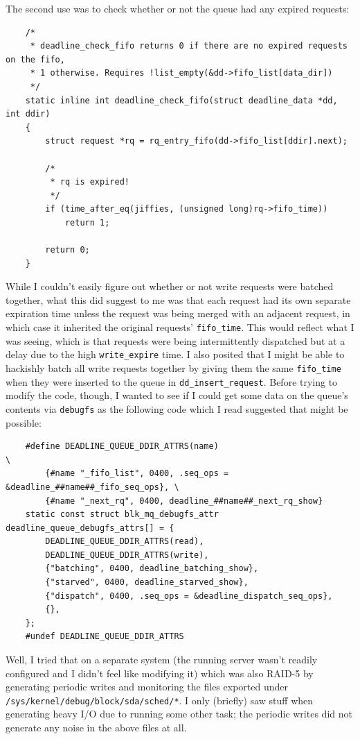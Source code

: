 \documentclass{article}
\begin{document}
The second use was to check whether or not the queue had any expired requests:
\begin{verbatim}
	/*
	 * deadline_check_fifo returns 0 if there are no expired requests on the fifo,
	 * 1 otherwise. Requires !list_empty(&dd->fifo_list[data_dir])
	 */
	static inline int deadline_check_fifo(struct deadline_data *dd, int ddir)
	{
		struct request *rq = rq_entry_fifo(dd->fifo_list[ddir].next);

		/*
		 * rq is expired!
		 */
		if (time_after_eq(jiffies, (unsigned long)rq->fifo_time))
			return 1;

		return 0;
	}
\end{verbatim}
While I couldn't easily figure out whether or not write requests were batched together, what this did suggest to me was that each request had its own separate expiration time unless the request was being merged with an adjacent request, in which case it inherited the original requests' \texttt{fifo_time}.  This would reflect what I was seeing, which is that requests were being intermittently dispatched but at a delay due to the high \texttt{write_expire} time.  I also posited that I might be able to hackishly batch all write requests together by giving them the same \texttt{fifo_time} when they were inserted to the queue in \texttt{dd_insert_request}.  Before trying to modify the code, though, I wanted to see if I could get some data on the queue's contents via \texttt{debugfs} as the following code which I read suggested that might be possible:
\begin{verbatim}
	#define DEADLINE_QUEUE_DDIR_ATTRS(name)                                         \
		{#name "_fifo_list", 0400, .seq_ops = &deadline_##name##_fifo_seq_ops}, \
		{#name "_next_rq", 0400, deadline_##name##_next_rq_show}
	static const struct blk_mq_debugfs_attr deadline_queue_debugfs_attrs[] = {
		DEADLINE_QUEUE_DDIR_ATTRS(read),
		DEADLINE_QUEUE_DDIR_ATTRS(write),
		{"batching", 0400, deadline_batching_show},
		{"starved", 0400, deadline_starved_show},
		{"dispatch", 0400, .seq_ops = &deadline_dispatch_seq_ops},
		{},
	};
	#undef DEADLINE_QUEUE_DDIR_ATTRS
\end{verbatim}
Well, I tried that on a separate system (the running server wasn't readily configured and I didn't feel like modifying it) which was also RAID-5 by generating periodic writes and monitoring the files exported under \texttt{/sys/kernel/debug/block/sda/sched/*}.  I only (briefly) saw stuff when generating heavy I/O due to running some other task; the periodic writes did not generate any noise in the above files at all.
\end{document}
